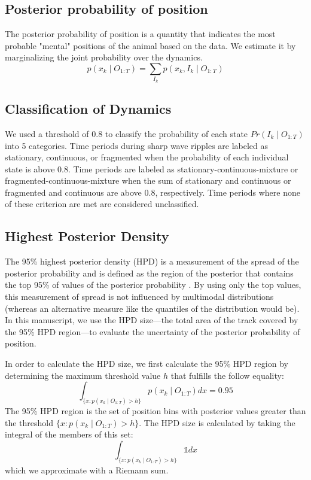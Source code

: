 \documentclass[9pt,lineno]{elife}
\begin{document}
\subsection*{Posterior probability of position}
The posterior probability of position is a quantity that indicates the most probable "mental" positions of the animal based on the data. We estimate it by marginalizing the joint probability over the dynamics.
$$p(x_{k} \mid O_{1:T}) = \sum_{I_{k}} p(x_{k}, I_{k} \mid O_{1:T})$$

\subsection*{Classification of Dynamics}
We used a threshold of 0.8 to classify the probability of each state $Pr(I_{k} \mid O_{1:T})$ into 5 categories. Time periods during sharp wave ripples are labeled as stationary, continuous, or fragmented when the probability of each individual state is above 0.8. Time periods are labeled as stationary-continuous-mixture or fragmented-continuous-mixture when the sum of stationary and continuous or fragmented and continuous are above 0.8, respectively. Time periods where none of these criterion are met are considered unclassified.

\subsection*{Highest Posterior Density}
The 95\% highest posterior density (HPD) is a measurement of the spread of the posterior probability and is defined as the region of the posterior that contains the top 95\% of values of the posterior probability \citep{CasellaStatisticalinference2001}. By using only the top values, this measurement of spread is not influenced by multimodal distributions (whereas an alternative measure like the quantiles of the distribution would be). In this manuscript, we use the HPD size---the total area of the track covered by the 95\% HPD region---to evaluate the uncertainty of the posterior probability of position. 

In order to calculate the HPD size, we first calculate the 95\% HPD region by determining the maximum threshold value $h$ that fulfills the follow equality:
$$
\int_{\{x: p(x_{k} \mid O_{1:T}) > h\}} p(x_{k} \mid O_{1:T})dx = 0.95
$$
The 95\% HPD region is the set of position bins with posterior values greater than the threshold $\{x : p(x_{k} \mid O_{1:T}) > h\}$. The HPD size is calculated by taking the integral of the members of this set:
$$
\int_{\{x: p(x_{k} \mid O_{1:T}) > h\}} \mathbb{1}dx
$$
which we approximate with a Riemann sum.
\end{document}
